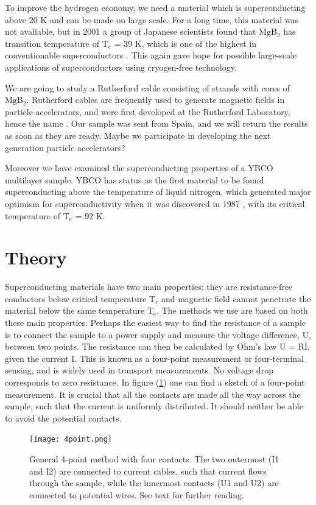 \documentclass{comjnl}
\newcommand*\chem[1]{\ensuremath{\mathrm{#1}}}
\begin{document}
To improve the hydrogen economy, we need a material which is superconducting above 20 K and can be made on large scale. For a long time, this material was not avaliable, but in 2001 a group of Japanese scientists found that \chem{MgB_2} has transition temperature of \chem{T_c} = 39 K, which is one of the highest in conventionable superconductors \cite {jsap}\cite {nature}. This again gave hope for possible large-scale applications of superconductors using cryogen-free technology. 

We are going to study a Rutherford cable consisting of strands with cores of \chem{MgB_2}. Rutherford cables are frequently used to generate magnetic fields in particle accelerators, and were first developed at the Rutherford Laboratory, hence the name \cite {fnal}. Our sample was sent from Spain, and we will return the results as soon as they are ready. Maybe we participate in developing the next generation particle accelerators?

Moreover we have examined the superconducting properties of a YBCO multilayer sample. YBCO has status as the first material to be found superconducting above the temperature of liquid nitrogen, which generated major optimism for superconductivity when it was discovered in 1987 \cite{harvard}, with its critical temperature of \chem{T_c} = 92 K. 

\section{Theory}\label{Sec:Theory}
Superconducting materials have two main properties: they are resistance-free conductors below critical temperature \chem{T_c} and magnetic field cannot penetrate the material below the same temperature \chem{T_c}. The methods we use are based on both these main properties. Perhaps the easiest way to find the resistance of a sample is to connect the sample to a power supply and measure the voltage difference, U, between two points. The resistance can then be calculated by Ohm's law U = RI, given the current I. This is known as a four-point measurement or four-terminal sensing, and is widely used in transport measurements. No voltage drop corresponds to zero resistance. In figure (\ref{fig:4point}) one can find a sketch of a four-point measurement. It is crucial that all the contacts are made all the way across the sample, such that the current is uniformly distributed. It should neither be able to avoid the potential contacts.
\begin{figure}[h]
\centering
\texttt{[image: 4point.png]}
\caption{General 4-point method with four contacts. The two outermost (I1 and I2) are connected to current cables, such that current flows through the sample, while the innermost contacts (U1 and U2) are connected to potential wires. See text for further reading. \label{fig:4point}}
\end{figure}
\end{document}
